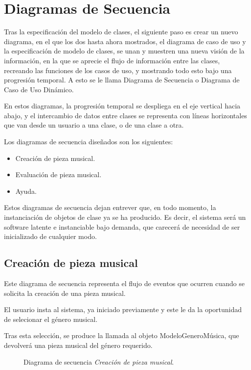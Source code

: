 
\chapter{Diagramas de Secuencia}

Tras la especificación del modelo de clases, el siguiente paso es crear un nuevo diagrama, en el que los dos hasta ahora mostrados, el diagrama de caso de uso y la especificación de modelo de clases, se unan y muestren una nueva visión de la información, en la que se aprecie el flujo de información entre las clases, recreando las funciones de los casos de uso, y mostrando todo esto bajo una progresión temporal. A esto se le llama Diagrama de Secuencia o Diagrama de Caso de Uso Dinámico.

En estos diagramas, la progresión temporal se despliega en el eje vertical hacia abajo, y el intercambio de datos entre clases se representa con líneas horizontales que van desde un usuario a una clase, o de una clase a otra.

Los diagramas de secuencia diseñados son los siguientes:

\begin{itemize}
    \item Creación de pieza musical.
    \item Evaluación de pieza musical.
    \item Ayuda.
\end{itemize}

Estos diagramas de secuencia dejan entrever que, en todo momento, la instanciación de objetos de clase ya se ha producido. Es decir, el sistema será un software latente e instanciable bajo demanda, que carecerá de necesidad de ser inicializado de cualquier modo.

\newpage
\section{Creación de pieza musical}

Este diagrama de secuencia representa el flujo de eventos que ocurren cuando se solicita la creación de una pieza musical.

El usuario insta al sistema, ya iniciado previamente y este le da la oportunidad de selecionar el género musical.

Tras esta selección, se produce la llamada al objeto ModeloGeneroMúsica, que devolverá una pieza musical del género requerido.

\begin{figure}[H]
  \centering
  
  \caption{Diagrama de secuencia \emph{Creación de pieza musical}.}
\end{figure}

